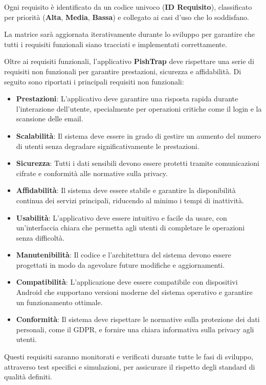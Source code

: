 \noindent
Ogni requisito è identificato da un codice univoco (\textbf{ID Requisito}), classificato per priorità (\textbf{Alta}, \textbf{Media}, \textbf{Bassa}) e collegato ai casi d'uso che lo soddisfano.

La matrice sarà aggiornata iterativamente durante lo sviluppo per garantire che tutti i requisiti funzionali siano tracciati e implementati correttamente.

Oltre ai requisiti funzionali, l'applicativo \textbf{PishTrap} deve rispettare una serie di requisiti non funzionali per garantire prestazioni, sicurezza e affidabilità. Di seguito sono riportati i principali requisiti non funzionali:

\begin{itemize}
    \item \textbf{Prestazioni}: L'applicativo deve garantire una risposta rapida durante l'interazione dell'utente, specialmente per operazioni critiche come il login e la scansione delle email.
    \item \textbf{Scalabilità}: Il sistema deve essere in grado di gestire un aumento del numero di utenti senza degradare significativamente le prestazioni.
    \item \textbf{Sicurezza}: Tutti i dati sensibili devono essere protetti tramite comunicazioni cifrate e conformità alle normative sulla privacy.
    \item \textbf{Affidabilità}: Il sistema deve essere stabile e garantire la disponibilità continua dei servizi principali, riducendo al minimo i tempi di inattività.
    \item \textbf{Usabilità}: L'applicativo deve essere intuitivo e facile da usare, con un'interfaccia chiara che permetta agli utenti di completare le operazioni senza difficoltà.
    \item \textbf{Manutenibilità}: Il codice e l'architettura del sistema devono essere progettati in modo da agevolare future modifiche e aggiornamenti.
    \item \textbf{Compatibilità}: L'applicazione deve essere compatibile con dispositivi Android che supportano versioni moderne del sistema operativo e garantire un funzionamento ottimale.
    \item \textbf{Conformità}: Il sistema deve rispettare le normative sulla protezione dei dati personali, come il GDPR, e fornire una chiara informativa sulla privacy agli utenti.
\end{itemize}

\noindent
Questi requisiti saranno monitorati e verificati durante tutte le fasi di sviluppo, attraverso test specifici e simulazioni, per assicurare il rispetto degli standard di qualità definiti.

